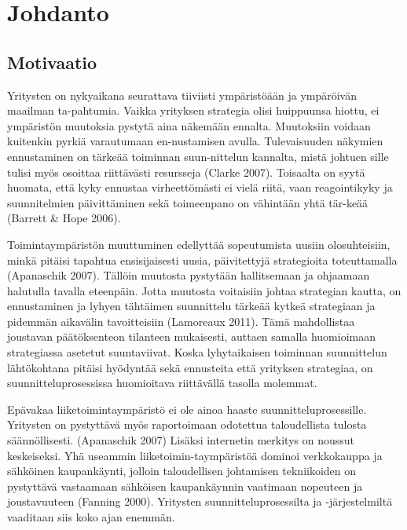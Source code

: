 \documentclass[12pt,a4paper,oneside,pdftex]{report}
\begin{document}

% 

\chapter{Johdanto}
\label{chapter:intro}

\section{Motivaatio}

Yritysten on nykyaikana seurattava tiiviisti ympäristöään ja ympäröivän maailman ta-pahtumia. Vaikka yrityksen strategia olisi huippuunsa hiottu, ei ympäristön muutoksia pystytä aina näkemään ennalta. Muutoksiin voidaan kuitenkin pyrkiä varautumaan en-nustamisen avulla. Tulevaisuuden näkymien ennustaminen on tärkeää toiminnan suun-nittelun kannalta, mistä johtuen sille tulisi myös osoittaa riittävästi resursseja (Clarke 2007). Toisaalta on syytä huomata, että kyky ennustaa virheettömästi ei vielä riitä, vaan reagointikyky ja suunnitelmien päivittäminen sekä toimeenpano on vähintään yhtä tär-keää (Barrett & Hope 2006).

Toimintaympäristön muuttuminen edellyttää sopeutumista uusiin olosuhteisiin, minkä pitäisi tapahtua ensisijaisesti uusia, päivitettyjä strategioita toteuttamalla (Apanaschik 2007). Tällöin muutosta pystytään hallitsemaan ja ohjaamaan halutulla tavalla eteenpäin. Jotta muutosta voitaisiin johtaa strategian kautta, on ennustaminen ja lyhyen tähtäimen suunnittelu tärkeää kytkeä strategiaan ja pidemmän aikavälin tavoitteisiin (Lamoreaux 2011). Tämä mahdollistaa joustavan päätöksenteon tilanteen mukaisesti, auttaen samalla huomioimaan strategiassa asetetut suuntaviivat. Koska lyhytaikaisen toiminnan suunnittelun lähtökohtana pitäisi hyödyntää sekä ennusteita että yrityksen strategiaa, on suunnitteluprosessissa huomioitava riittävällä tasolla molemmat.

Epävakaa liiketoimintaympäristö ei ole ainoa haaste suunnitteluprosessille. Yritysten on pystyttävä myös raportoimaan odotettua taloudellista tulosta säännöllisesti. (Apanaschik 2007) Lisäksi internetin merkitys on noussut keskeiseksi. Yhä useammin liiketoimin-taympäristöä dominoi verkkokauppa ja sähköinen kaupankäynti, jolloin taloudellisen johtamisen tekniikoiden on pystyttävä vastaamaan sähköisen kaupankäynnin vaatimaan nopeuteen ja joustavuuteen (Fanning 2000). Yritysten suunnitteluprosessilta ja -järjestelmiltä vaaditaan siis koko ajan enemmän.
\end{document}
